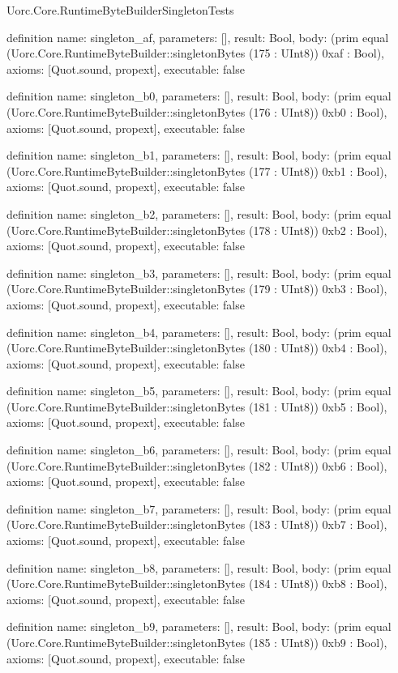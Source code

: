 \begin{lexlean}{Uorc.Core.RuntimeByteBuilderSingletonTests}
\begin{semanticmodule}
definition{
  name: singleton_af,
  parameters: [],
  result: Bool,
  body: (prim equal (Uorc.Core.RuntimeByteBuilder::singletonBytes (175 : UInt8)) 0xaf : Bool),
  axioms: [Quot.sound, propext],
  executable: false
}

definition{
  name: singleton_b0,
  parameters: [],
  result: Bool,
  body: (prim equal (Uorc.Core.RuntimeByteBuilder::singletonBytes (176 : UInt8)) 0xb0 : Bool),
  axioms: [Quot.sound, propext],
  executable: false
}

definition{
  name: singleton_b1,
  parameters: [],
  result: Bool,
  body: (prim equal (Uorc.Core.RuntimeByteBuilder::singletonBytes (177 : UInt8)) 0xb1 : Bool),
  axioms: [Quot.sound, propext],
  executable: false
}

definition{
  name: singleton_b2,
  parameters: [],
  result: Bool,
  body: (prim equal (Uorc.Core.RuntimeByteBuilder::singletonBytes (178 : UInt8)) 0xb2 : Bool),
  axioms: [Quot.sound, propext],
  executable: false
}

definition{
  name: singleton_b3,
  parameters: [],
  result: Bool,
  body: (prim equal (Uorc.Core.RuntimeByteBuilder::singletonBytes (179 : UInt8)) 0xb3 : Bool),
  axioms: [Quot.sound, propext],
  executable: false
}

definition{
  name: singleton_b4,
  parameters: [],
  result: Bool,
  body: (prim equal (Uorc.Core.RuntimeByteBuilder::singletonBytes (180 : UInt8)) 0xb4 : Bool),
  axioms: [Quot.sound, propext],
  executable: false
}

definition{
  name: singleton_b5,
  parameters: [],
  result: Bool,
  body: (prim equal (Uorc.Core.RuntimeByteBuilder::singletonBytes (181 : UInt8)) 0xb5 : Bool),
  axioms: [Quot.sound, propext],
  executable: false
}

definition{
  name: singleton_b6,
  parameters: [],
  result: Bool,
  body: (prim equal (Uorc.Core.RuntimeByteBuilder::singletonBytes (182 : UInt8)) 0xb6 : Bool),
  axioms: [Quot.sound, propext],
  executable: false
}

definition{
  name: singleton_b7,
  parameters: [],
  result: Bool,
  body: (prim equal (Uorc.Core.RuntimeByteBuilder::singletonBytes (183 : UInt8)) 0xb7 : Bool),
  axioms: [Quot.sound, propext],
  executable: false
}

definition{
  name: singleton_b8,
  parameters: [],
  result: Bool,
  body: (prim equal (Uorc.Core.RuntimeByteBuilder::singletonBytes (184 : UInt8)) 0xb8 : Bool),
  axioms: [Quot.sound, propext],
  executable: false
}

definition{
  name: singleton_b9,
  parameters: [],
  result: Bool,
  body: (prim equal (Uorc.Core.RuntimeByteBuilder::singletonBytes (185 : UInt8)) 0xb9 : Bool),
  axioms: [Quot.sound, propext],
  executable: false
}


\end{semanticmodule}
\end{lexlean}
